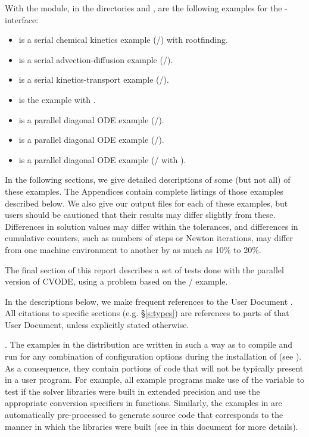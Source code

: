 With the {\fcvode} module, in the directories 
 and
, are the following examples for
the {\F}-{\C} interface:
\begin{itemize}
\item {} is a serial chemical kinetics example (/{\dense})
       with rootfinding.
\item {} is a serial advection-diffusion example (/{\band}).
\item {} is a serial kinetics-transport example (/{\spgmr}).
\item {} is the  example with {\fcvbp}.
\item {} is a parallel diagonal ODE example
       (/).
\item {} is a parallel diagonal ODE example (/{\spgmr}).
\item {} is a parallel diagonal ODE example (/{\spgmr}
       with {\fcvbbd}).
\end{itemize}

\vspace{0.2in}\noindent
In the following sections, we give detailed descriptions of some (but
not all) of these examples.  The Appendices contain complete listings
of those examples described below.  We also give our output files for
each of these examples, but users should be cautioned that their
results may differ slightly from these.  Differences in solution
values may differ within the tolerances, and differences in cumulative
counters, such as numbers of steps or Newton iterations, may differ
from one machine environment to another by as much as 10\% to 20\%.

The final section of this report describes a set of tests done with the
parallel version of CVODE, using a problem based on the /
example.

In the descriptions below, we make frequent references to the {\cvode}
User Document \cite{cvode2.4.0_ug}.  All citations to specific sections
(e.g. \S\ref{s:types}) are references to parts of that User Document, unless
explicitly stated otherwise.

\vspace{0.2in}.
The examples in the {\cvode} distribution are written in such a way as
to compile and run for any combination of configuration options during
the installation of {\sundials} (see ). As a consequence,
they contain portions of code that will not be typically present in a
user program. For example, all {\C} example programs make use of the
variable  to test if the solver libraries
were built in extended precision and use the appropriate conversion 
specifiers in  functions. Similarly, the {\F} examples in
{\fcvode} are automatically pre-processed to generate source code that
corresponds to the manner in which the {\cvode} libraries were built
(see  in this document for more details).
